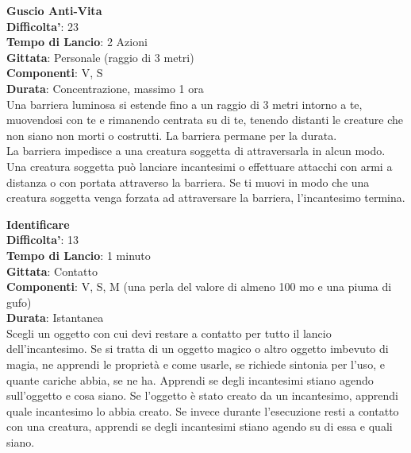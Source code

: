 \begin{multicols}{2}
\medskip\textbf{Guscio Anti-Vita}\\
\textbf{Difficolta'}: 23\\
\textbf{Tempo di Lancio}: 2 Azioni\\
\textbf{Gittata}: Personale (raggio di 3 metri)\\
\textbf{Componenti}: V, S\\
\textbf{Durata}: Concentrazione, massimo 1 ora\\
Una barriera luminosa si estende fino a un raggio di 3 metri intorno a te, muovendosi con te e rimanendo centrata su di te, tenendo distanti le creature che non siano non morti o costrutti. La barriera permane per la durata. \\
La barriera impedisce a una creatura soggetta di attraversarla in alcun modo. Una creatura soggetta può lanciare incantesimi o effettuare attacchi con armi a distanza o con portata attraverso la barriera. Se ti muovi in modo che una creatura soggetta venga forzata ad attraversare la barriera, l’incantesimo termina.

\medskip\textbf{Identificare}\\
\textbf{Difficolta'}: 13\\
\textbf{Tempo di Lancio}: 1 minuto\\
\textbf{Gittata}: Contatto\\
\textbf{Componenti}: V, S, M (una perla del valore di almeno 100 mo e una piuma di gufo)\\ \textbf{Durata}: Istantanea\\
Scegli un oggetto con cui devi restare a contatto per tutto il lancio dell’incantesimo. Se si tratta di un oggetto magico o altro oggetto imbevuto di magia, ne apprendi le proprietà e come usarle, se richiede sintonia per l’uso, e quante cariche abbia, se ne ha. Apprendi se degli incantesimi stiano agendo sull’oggetto e cosa siano. Se l’oggetto è stato creato da un incantesimo, apprendi quale incantesimo lo abbia creato. Se invece durante l’esecuzione resti a contatto con una creatura, apprendi se degli incantesimi stiano agendo su di essa e quali siano.


\end{multicols}
